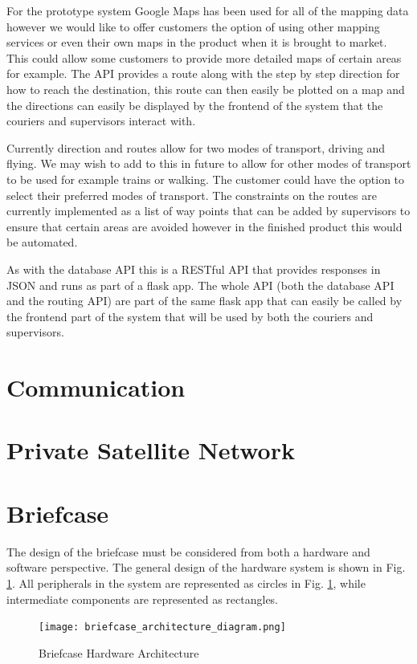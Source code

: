 For the prototype system Google Maps has been used for all of the mapping data however we would like to offer customers the option of using other mapping services or even their own maps in the product when it is brought to market. This could allow some customers to provide more detailed maps of certain areas for example. The API provides a route along with the step by step direction for how to reach the destination, this route can then easily be plotted on a map and the directions can easily be displayed by the frontend of the system that the couriers and supervisors interact with.

Currently direction and routes allow for two modes of transport, driving and flying. We may wish to add to this in future to allow for other modes of transport to be used for example trains or walking. The customer could have the option to select their preferred modes of transport. The constraints on the routes are currently implemented as a list of way points that can be added by supervisors to ensure that certain areas are avoided however in the finished product this would be automated.

As with the database API this is a RESTful API that provides responses in JSON and runs as part of a flask app. The whole API (both the database API and the routing API) are part of the same flask app that can easily be called by the frontend part of the system that will be used by both the couriers and supervisors.

\section{Communication} \label{communicationarch}

\section{Private Satellite Network}

\section{Briefcase} \label{briefcasearch}
The design of the briefcase must be considered from both a hardware and software perspective. The general design of the hardware system is shown in Fig. \ref{fig:briefcase_architecture}. All peripherals in the system are represented as circles in Fig. \ref{fig:briefcase_architecture}, while intermediate components are represented as rectangles.
\begin{figure}[h]
    \centering
    \texttt{[image: briefcase\_architecture\_diagram.png]}
    \caption{Briefcase Hardware Architecture}
    \label{fig:briefcase_architecture}
\end{figure}

